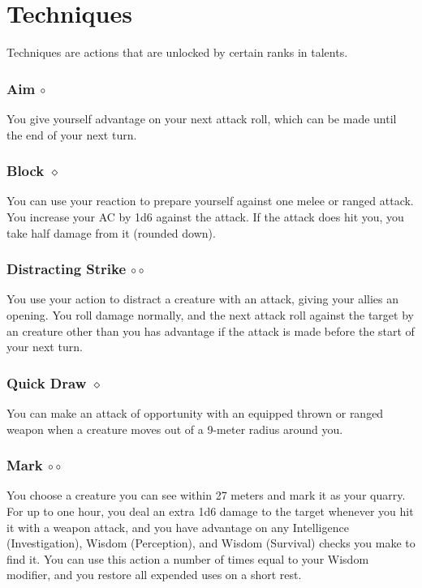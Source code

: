 \section{Techniques} %
Techniques are actions that are unlocked by certain ranks in talents. %



\subsubsection{Aim $\circ$} \label{act::aim}
    You give yourself advantage on your next attack roll, which can be made until the end of your next turn.

\subsubsection{Block $\diamond$} \label{act::block}
    You can use your reaction to prepare yourself against one melee or ranged attack.
    You increase your AC by 1d6 against the attack.
    If the attack does hit you, you take half damage from it (rounded down).

\subsubsection{Distracting Strike $\circ\circ$} \label{act::distractingstrike}
    You use your action to distract a creature with an attack, giving your allies an opening.
    You roll damage normally, and the next attack roll against the target by an creature other than you has advantage if the attack is made before the start of your next turn.

\subsubsection{Quick Draw $\diamond$} \label{act::quickdraw}
    You can make an attack of opportunity with an equipped thrown or ranged weapon when a creature moves out of a 9-meter radius around you.

\subsubsection{Mark $\circ\circ$} \label{act::mark}
    You choose a creature you can see within 27 meters and mark it as your quarry.
    For up to one hour, you deal an extra 1d6 damage to the target whenever you hit it with a weapon attack, and you have advantage on any Intelligence (Investigation), Wisdom (Perception), and Wisdom (Survival) checks you make to find it.
    You can use this action a number of times equal to your Wisdom modifier, and you restore all expended uses on a short rest.

